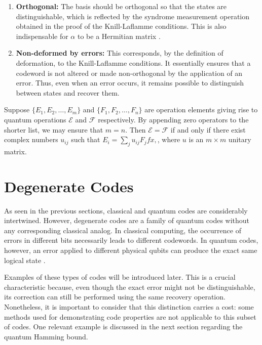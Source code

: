 \begin{enumerate}
\item \textbf{Orthogonal:} The basis should be orthogonal so that the states are distinguishable, which is reflected by the syndrome measurement operation obtained in the proof of the Knill-Laflamme conditions. This is also indispensable for $\alpha$ to be a Hermitian matrix \citep{Kitaev2002}.
\item \textbf{Non-deformed by errors:} This corresponds, by the definition of deformation, to the Knill-Laflamme conditions. It essentially ensures that a codeword is not altered or made non-orthogonal by the application of an error. Thus, even when an error occurs, it remains possible to distinguish between states and recover them.
\end{enumerate}

\begin{lemma}\label{theorem_8_2}
Suppose $\{E_1, E_2, \ldots, E_m\}$ and $\{F_1, F_2, \ldots, F_n\}$ are operation elements giving rise to quantum operations $\mathcal{E}$ and $\mathcal{F}$ respectively. By appending zero operators to the shorter list, we may ensure that $m = n$. Then $\mathcal{E} = \mathcal{F}$ if and only if there exist complex numbers $u_{ij}$ such that $E_i = \sum_{j} u_{ij} F_jfx,$, where $u$ is an $m \times m$ unitary matrix.
\end{lemma}

\section{Degenerate Codes}

As seen in the previous sections, classical and quantum codes are considerably intertwined. However, degenerate codes are a family of quantum codes without any corresponding classical analog. In classical computing, the occurrence of errors in different bits necessarily leads to different codewords. In quantum codes, however, an error applied to different physical qubits can produce the exact same logical state \citep{Nielsen2010}.

Examples of these types of codes will be introduced later. This is a crucial characteristic because, even though the exact error might not be distinguishable, its correction can still be performed using the same recovery operation. Nonetheless, it is important to consider that this distinction carries a cost: some methods used for demonstrating code properties are not applicable to this subset of codes. One relevant example is discussed in the next section regarding the quantum Hamming bound.

